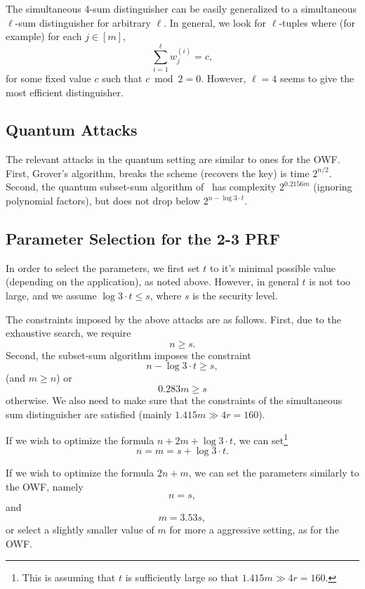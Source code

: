 \documentclass{article}
\begin{document}
The simultaneous 4-sum distinguisher can be easily generalized to a
simultaneous $\ell$-sum distinguisher for arbitrary $\ell$.
In general, we look for $\ell$-tuples where (for example)
for each $j \in [m]$, $$\sum_{i = 1}^{\ell} w^{(i)}_j = c,$$
for some fixed value $c$ such that $c \bmod 2 = 0$.
However, $\ell = 4$ seems to give the most efficient
distinguisher.



\subsection{Quantum Attacks}

The relevant attacks in the quantum setting are similar to ones for the OWF.
First, Grover's algorithm, breaks the scheme (recovers the key) is time $2^{n/2}$.
Second, the quantum subset-sum algorithm of~\cite{BonnetainBSS20} has complexity $2^{0.2156 m}$ (ignoring polynomial factors), but does not drop below $2^{n - \log 3 \cdot t}$.


\subsection{Parameter Selection for the 2-3 PRF}

In order to select the parameters, we first set $t$ to it's minimal possible value
(depending on the application), as noted above.
However, in general $t$ is not too large, and we assume $\log 3 \cdot t \leq s$,
where $s$ is the security level.

The constraints imposed by the above attacks are as follows.
First, due to the exhaustive search, we require $$n \geq s.$$
Second, the subset-sum algorithm
imposes the constraint
$$n - \log 3 \cdot t \geq s,$$
(and $m \geq n$)
or
$$0.283m \geq s$$
otherwise.
We also need to make sure that the constraints of the simultaneous sum distinguisher are satisfied
(mainly $1.415 m \gg 4r = 160$).


If we wish to optimize the formula
$n + 2m + \log 3 \cdot t$, we can set\footnote{This is assuming that $t$ is sufficiently large so that $1.415 m \gg 4r = 160$.}
$$n = m = s + \log 3 \cdot t.$$

If we wish to optimize the formula $2n + m$, we can set the parameters similarly to the OWF,
namely
$$n = s,$$
and
$$m = 3.53 s,$$
or select a slightly smaller value of $m$ for more a aggressive setting,
as for the OWF.






\end{document}
